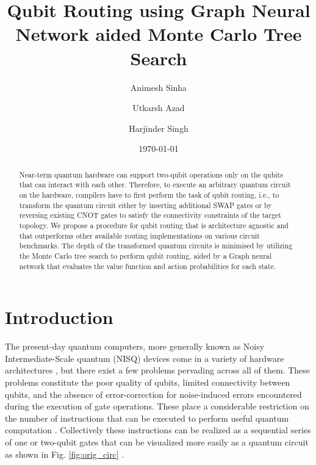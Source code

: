 \documentclass[%
 reprint,
amsmath,amssymb,showkeys,
pra,
]{revtex4-2}
\begin{document}

\title{Qubit Routing using Graph Neural Network aided Monte Carlo Tree Search}

\author{Animesh Sinha}
\author{Utkarsh Azad}
\author{Harjinder Singh}

%

\date{\today}%

\begin{abstract}
Near-term quantum hardware can support two-qubit operations only on the qubits that can interact with each other. Therefore, to execute an arbitrary quantum circuit on the hardware, compilers have to first perform the task of qubit routing, i.e., to transform the quantum circuit either by inserting additional SWAP gates or by reversing existing CNOT gates to satisfy the connectivity constraints of the target topology. We propose a procedure for qubit routing that is architecture agnostic and that outperforms other available routing implementations on various circuit benchmarks. The depth of the transformed quantum circuits is minimised by utilizing the Monte Carlo tree search to perform qubit routing, aided by a Graph neural network that evaluates the value function and action probabilities for each state.
\end{abstract}

\maketitle


\section{\label{sec:intro}Introduction}

The present-day quantum computers, more generally known as Noisy Intermediate-Scale quantum (NISQ) devices \citep{nisq_preskill} come in a variety of hardware architectures \cite{IBMQ, hardware_sycamore, hardware_rigetti_aspen, hardware_xanadu}, but there exist a few problems pervading across all of them. These problems constitute the poor quality of qubits, limited connectivity between qubits, and the absence of error-correction for noise-induced errors encountered during the execution of gate operations. These place a considerable restriction on the number of instructions that can be executed to perform useful quantum computation \cite{nisq_preskill}. Collectively these instructions can be realized as a sequential series of one or two-qubit gates that can be visualized more easily as a quantum circuit as shown in Fig. \ref{fig:orig_circ} \citep{others_childs}.
\end{document}
